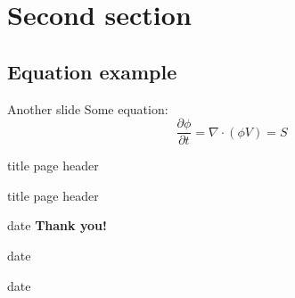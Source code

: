 \documentclass[compress, aspectratio=169]{beamer}
\begin{document}
\section{Second section}
\subsection{Equation example}
\begin{frame}{Another slide}
  Some equation:
  \begin{equation*}
    \frac{\partial\phi}{\partial t} = \nabla \cdot \left(\phi V\right) = S
    \label{eq:1}
  \end{equation*}

  
\end{frame}


\begin{thanks-frame}
  \hspace{-1cm}%
  \begin{beamercolorbox}[wd=\titleWidth,sep=15pt,dp=2.5ex,center]{title page header}
    \inserttitle\par%
  \end{beamercolorbox}%
  \vskip-30pt
  \hspace{-1cm}%
  \begin{beamercolorbox}[wd=\titleWidth,sep=15pt,center]{title page header}
    \insertsubtitle\par%
  \end{beamercolorbox}%
  \vfill
  \hspace{-1cm}%
  \begin{beamercolorbox}[wd=\titleWidth,sep=15pt,center]{date}
    {\huge\bfseries Thank you!}\par
  \end{beamercolorbox}
  \vfill
  \hspace{-1cm}%
  \begin{beamercolorbox}[wd=\titleWidth,sep=15pt,center]{date}
    \insertconference%
  \end{beamercolorbox}
  \vskip-20pt
  \hspace{-1cm}
  \begin{beamercolorbox}[wd=\titleWidth,sep=15pt,center]{date}
    \insertdate%
  \end{beamercolorbox}
  \vfill

\end{thanks-frame} 
\end{document}
